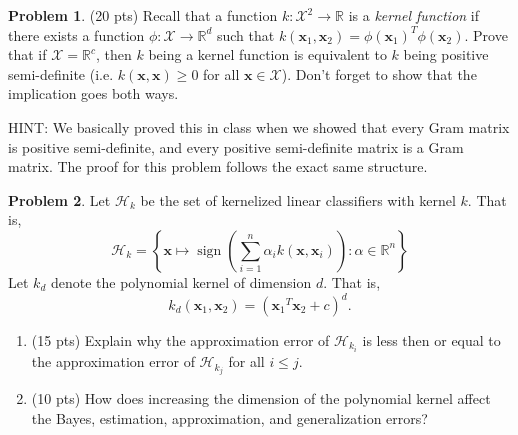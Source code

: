 \documentclass[10pt]{article}
\theoremstyle{definition}
\newtheorem{problem}{Problem}
\newcommand{\R}{\mathbb R}
\DeclareMathOperator{\sign}{sign}
\newcommand{\trans}[1]{{#1}^{T}}
\newcommand{\x}{\mathbf x}
\begin{document}
\begin{problem}
    (20 pts)
    Recall that a function $k : \mathcal X^2 \to \R$ is a \emph{kernel function} if there exists a function $\phi : \mathcal X \to \R^{d}$ such that $k(\x_1,\x_2) = \trans{\phi(\x_1)}\phi(\x_2)$.
    Prove that if $\mathcal X = \R^c$, then $k$ being a kernel function is equivalent to $k$ being positive semi-definite (i.e. $k(\x,\x) \ge 0$ for all $\x\in\mathcal X$).
    Don't forget to show that the implication goes both ways.

    HINT: We basically proved this in class when we showed that every Gram matrix is positive semi-definite, and every positive semi-definite matrix is a Gram matrix.
    The proof for this problem follows the exact same structure.
\end{problem}
\newpage


\begin{problem}
    Let $\mathcal H_k$ be the set of kernelized linear classifiers with kernel $k$.
    That is,
    \begin{equation}
        \mathcal H_k = \left\{ \x \mapsto \sign\left( \sum_{i=1}^n \alpha_i k(\x,\x_i) \right) : \alpha \in \R^n \right\}
    \end{equation}
    Let $k_d$ denote the polynomial kernel of dimension $d$.
    That is,
    \begin{equation}
        k_d (\x_1,\x_2) = (\trans{\x_1}{\x_2} + c)^d
        .
    \end{equation}
    \begin{enumerate}
        \item (15 pts)
            Explain why the approximation error of $\mathcal H_{k_i}$ is less then or equal to the approximation error of $\mathcal H_{k_j}$ for all $i \le j$.
            \vspace{4in}
        \item (10 pts)
            How does increasing the dimension of the polynomial kernel affect the Bayes, estimation, approximation, and generalization errors?
    \end{enumerate}
\end{problem}
\newpage
\end{document}
